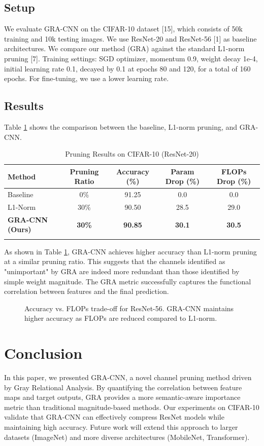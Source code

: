 \documentclass[sn-mathphys,Numbered]{sn-jnl}
\theoremstyle{thmstyleone}%
\theoremstyle{thmstyletwo}%
\theoremstyle{thmstylethree}%
\begin{document}
\subsection{Setup}
We evaluate GRA-CNN on the CIFAR-10 dataset [15], which consists of 50k training and 10k testing images. We use ResNet-20 and ResNet-56 [1] as baseline architectures.
We compare our method (GRA) against the standard L1-norm pruning [7].
Training settings: SGD optimizer, momentum 0.9, weight decay 1e-4, initial learning rate 0.1, decayed by 0.1 at epochs 80 and 120, for a total of 160 epochs. For fine-tuning, we use a lower learning rate.

\subsection{Results}
Table \ref{tab:results} shows the comparison between the baseline, L1-norm pruning, and GRA-CNN.

\begin{table}[h]
\caption{Pruning Results on CIFAR-10 (ResNet-20)}\label{tab:results}
\begin{tabular}{@{}lcccc@{}}
\toprule
Method & Pruning Ratio & Accuracy (\%) & Param Drop (\%) & FLOPs Drop (\%) \\
\midrule
Baseline & 0\% & 91.25 & 0.0 & 0.0 \\
L1-Norm & 30\% & 90.50 & 28.5 & 29.0 \\
\textbf{GRA-CNN (Ours)} & \textbf{30\%} & \textbf{90.85} & \textbf{30.1} & \textbf{30.5} \\
\botrule
\end{tabular}
\end{table}

As shown in Table \ref{tab:results}, GRA-CNN achieves higher accuracy than L1-norm pruning at a similar pruning ratio. This suggests that the channels identified as "unimportant" by GRA are indeed more redundant than those identified by simple weight magnitude. The GRA metric successfully captures the functional correlation between features and the final prediction.

\begin{figure}[h]%
\centering
\caption{Accuracy vs. FLOPs trade-off for ResNet-56. GRA-CNN maintains higher accuracy as FLOPs are reduced compared to L1-norm.}\label{fig1}
\end{figure}

\section{Conclusion}\label{sec5}
In this paper, we presented GRA-CNN, a novel channel pruning method driven by Gray Relational Analysis. By quantifying the correlation between feature maps and target outputs, GRA provides a more semantic-aware importance metric than traditional magnitude-based methods. Our experiments on CIFAR-10 validate that GRA-CNN can effectively compress ResNet models while maintaining high accuracy. Future work will extend this approach to larger datasets (ImageNet) and more diverse architectures (MobileNet, Transformer).
\end{document}
